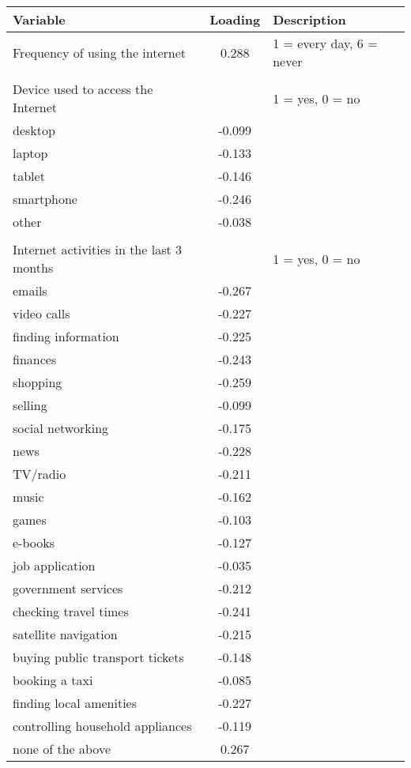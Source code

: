 \documentclass[12pt]{article}
\begin{document}
    \begin{tabular}{lcl}
        \toprule
        Variable & Loading & Description \\
        \midrule
        Frequency of using the internet & 0.288 & 1 = every day, 6 = never \\
        & & \\
        Device used to access the Internet & & 1 = yes, 0 = no \\
        desktop & -0.099 &  \\
        laptop & -0.133 & \\
        tablet & -0.146 & \\
        smartphone & -0.246 & \\
        other & -0.038 & \\
        & & \\
        Internet activities in the last 3 months & & 1 = yes, 0 = no \\
        emails & -0.267 & \\
        video calls & -0.227 & \\
        finding information & -0.225 & \\
        finances & -0.243 & \\
        shopping & -0.259 & \\
        selling & -0.099 & \\
        social networking & -0.175 & \\
        news & -0.228 & \\
        TV/radio & -0.211 & \\
        music & -0.162 & \\
        games & -0.103 & \\
        e-books & -0.127 & \\
        job application & -0.035 & \\
        government services & -0.212 & \\
        checking travel times & -0.241 & \\
        satellite navigation & -0.215 & \\
        buying public transport tickets & -0.148 & \\
        booking a taxi & -0.085 & \\
        finding local amenities & -0.227 & \\
        controlling household appliances & -0.119 & \\
        none of the above & 0.267 & \\
        \bottomrule
    \end{tabular}
\end{document}
